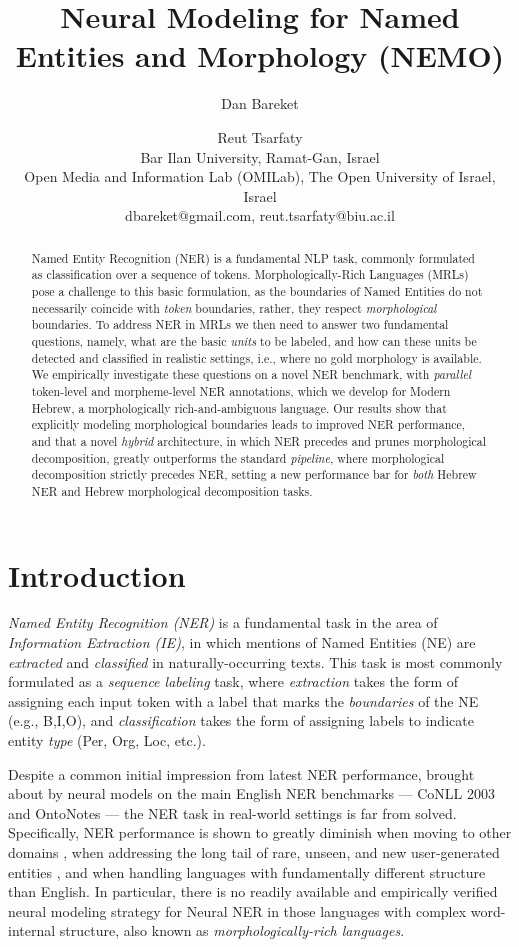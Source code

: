 \documentclass[11pt,a4paper]{article}
\title{Neural Modeling for Named Entities and Morphology (NEMO)}
\author{
 Dan Bareket \and Reut Tsarfaty \\
 Bar Ilan University, Ramat-Gan, Israel\\
 Open Media and Information Lab (OMILab), The Open University of Israel, Israel\\
  {\sf dbareket@gmail.com}, {\sf reut.tsarfaty@biu.ac.il}\\
}
\date{}
\begin{document}
\maketitle
\begin{abstract}
Named Entity Recognition (NER)  is a fundamental NLP task, commonly formulated as classification over a sequence of tokens. Morphologically-Rich Languages (MRLs) pose a challenge to this basic formulation, as 
the boundaries of Named Entities do not necessarily coincide with {\em token} boundaries, rather, they respect  {\em morphological} boundaries. 
To address NER in MRLs we then need to answer two fundamental questions, namely,
what are the basic {\em units} to be labeled, and how can these units be detected and classified  in realistic settings, i.e., where no gold morphology is available.
We empirically investigate these questions on  a novel  NER benchmark, with {\em parallel} token-level and morpheme-level NER annotations, which we develop for Modern Hebrew, a morphologically rich-and-ambiguous  language. 
Our results show that 
explicitly modeling morphological boundaries  leads to improved NER performance,  and that   a novel {\em hybrid} architecture, in which NER precedes and prunes morphological decomposition, greatly outperforms the standard {\em pipeline},  where morphological decomposition  strictly precedes NER, setting a new performance bar for {\em both}  Hebrew NER and Hebrew  morphological decomposition tasks.

\end{abstract}


\section{Introduction}
\textit{Named Entity Recognition (NER)} is a fundamental task in the area of \textit{Information Extraction (IE)}, in which mentions of Named Entities (NE) 
are {\it extracted} and \textit{classified} in naturally-occurring texts.  This task is most commonly formulated as a {\em sequence labeling}   task, where  \textit{extraction}  takes the form of assigning each input token with a label that marks the {\em boundaries} of the NE (e.g., B,I,O),  and   \textit{classification} takes the form of assigning labels to  indicate   entity {\em type}   ({\sc Per, Org, Loc}, etc.). 

Despite a common initial impression from latest NER performance,  brought about by neural models on the main English NER benchmarks --- CoNLL 2003 \cite{conll2003} and OntoNotes \cite{weischedel2013ontonotes} --- the NER task in real-world settings is far from solved.
Specifically, NER performance is shown to greatly diminish when moving to other domains \cite{luan-etal-2018-multi,song2018comparison}, when addressing the long tail of rare, unseen, and new  user-generated entities \cite{derczynski-etal-2017-results}, and when handling  languages with fundamentally different structure than English.
In particular, there is no readily available and empirically verified neural modeling strategy for Neural NER in those languages with complex word-internal structure,   also known as 
{\em morphologically-rich languages}.
\end{document}
